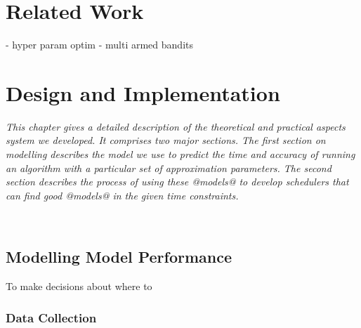 \documentclass[a4paper,12pt,twoside,openright]{report}
\begin{document}




\chapter{Related Work} 

- hyper param optim
- multi armed bandits











\chapter{Design and Implementation} 



\textit{This chapter gives a detailed description of the theoretical and practical aspects system we developed. It comprises two major sections. The first section on modelling describes the model we use to predict the time and accuracy of running an algorithm with a particular set of approximation parameters. The second section describes the process of using these @models@ to develop schedulers that can find good @models@ in the given time constraints.}

\

\section{Modelling Model Performance}
To make decisions about where to 


\subsection{Data Collection}
\end{document}
